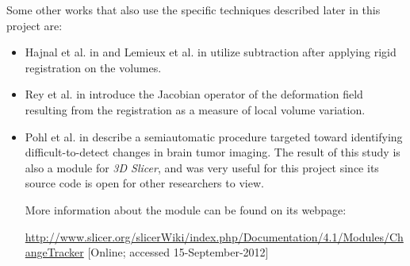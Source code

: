 Some other works that also use the specific techniques described later in this project are:
\begin{itemize}
\item Hajnal et al. in \cite{hajnal} and Lemieux et al. in \cite{lemieux} utilize subtraction after applying rigid registration on the volumes.
\item Rey et al. in \cite{rey} introduce the Jacobian operator of the deformation field resulting from the registration as a measure of local volume variation.
\item Pohl et al. in \cite{pohlCT} describe a semiautomatic procedure targeted toward identifying difficult-to-detect changes in brain tumor imaging. The result of this study is also a module for \textit{3D Slicer}, and was very useful for this project since its source code is open for other researchers to view. 

More information about the module can be found on its webpage: 

\url{http://www.slicer.org/slicerWiki/index.php/Documentation/4.1/Modules/ChangeTracker}
[Online; accessed 15-September-2012]
\end{itemize}


